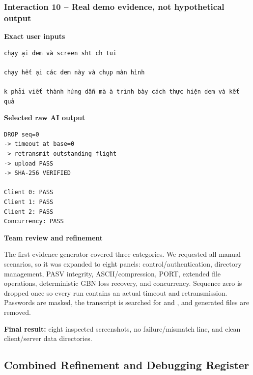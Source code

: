 \subsubsection{Interaction 10 -- Real demo evidence, not hypothetical output}

\sourceB

\textbf{Exact user inputs}

\begin{lstlisting}
chạy ại dem và screen sht ch tui

chạy hết ại các dem này và chụp màn hình

k phải viết thành hứng dẫn mà à trình bày cách thực hiện dem và kết quả
\end{lstlisting}

\textbf{Selected raw AI output}

\begin{lstlisting}
DROP seq=0
-> timeout at base=0
-> retransmit outstanding flight
-> upload PASS
-> SHA-256 VERIFIED

Client 0: PASS
Client 1: PASS
Client 2: PASS
Concurrency: PASS
\end{lstlisting}

\textbf{Team review and refinement}

The first evidence generator covered three categories. We requested all
manual scenarios, so it was expanded to eight panels: control/authentication,
directory management, PASV integrity, ASCII/compression, PORT, extended file
operations, deterministic GBN loss recovery, and concurrency. Sequence zero
is dropped once so every run contains an actual timeout and retransmission.
Passwords are masked, the transcript is searched for  and
, and generated files are removed.

\textbf{Final result:} eight inspected screenshots, no failure/mismatch line,
and clean client/server data directories.

\subsection{Combined Refinement and Debugging Register}

